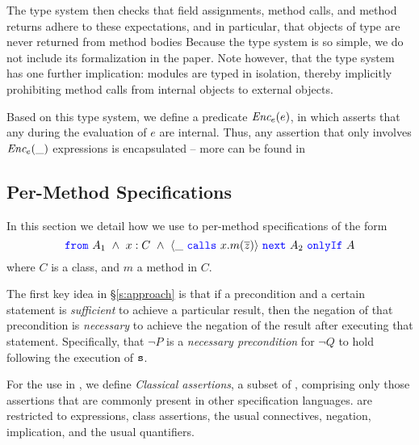 The type system then checks 
that field assignments, method calls, and method returns adhere to these expectations,
and in particular, that objects of \enclosed type
are never returned from method bodies 
Because the type system is so simple, we do not include its formalization in the paper.
Note however, that the type system has one further implication: modules are typed 
in isolation, thereby implicitly prohibiting
method calls from internal objects to external objects. 

Based on this type system, we define a predicate $\textit{Enc$_e$}(e)$, in  %
which asserts that any  during the evaluation of $e$ are internal.
Thus, any assertion that only involves $\textit{Enc$_e$}(\_)$ expressions is encapsulated -- more can be found in  %

\subsection{Per-Method \Nec Specifications}
\label{s:classical-proof}
In this section we detail how we use \funcSpecs
to  per-method \Nec specifications  
of the form 
$$\onlyIfSingle{A_1\ \wedge\ x : C\ \wedge\ \calls{\_}{x}{m}{\overline{z}}}{A_2}{A}$$
where $C$ is a class, and $m$ a method in $C$.


The first key idea in \S \ref{s:approach}
is that if a precondition and a certain statement is \emph{sufficient}
to achieve a particular result, %
then the negation of that precondition
is \emph{necessary} to achieve the negation of the result after executing that statement.
Specifically, 
  that $\neg P$ is a \emph{necessary precondition} for $\neg Q$ to 
hold following the execution of ${\texttt{s}}$.

For the use in \funcSpecs, we define \emph{Classical assertions}, a subset of \SpecO, comprising only those 
assertions that are commonly present in other specification languages.
 are restricted to expressions, class assertions, the usual connectives, negation, 
implication, and the usual quantifiers.


